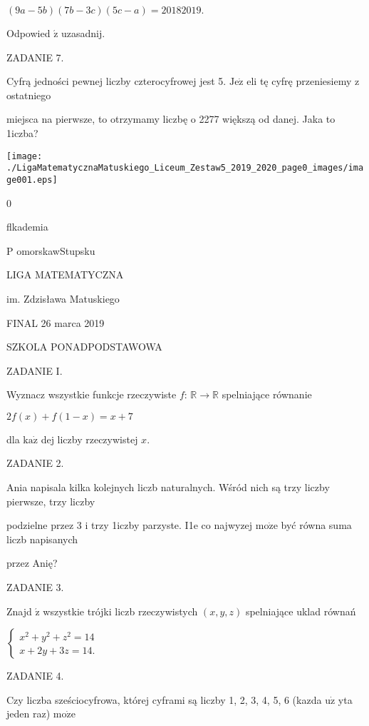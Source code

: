 \documentclass[a4paper,12pt]{article}
\begin{document}
$(9a-5b)(7b-3c)(5c-a)=20182019.$

Odpowied $\acute{\mathrm{z}}$ uzasadnij.

ZADANIE 7.

Cyfrą jedności pewnej liczby czterocyfrowej jest 5. $\mathrm{J}\mathrm{e}\dot{\mathrm{z}}$ eli tę cyfrę przeniesiemy z ostatniego

miejsca na pierwsze, to otrzymamy liczbę o 2277 większą od danej. Jaka to 1iczba?





\begin{center}
\texttt{[image: ./LigaMatematycznaMatuskiego\_Liceum\_Zestaw5\_2019\_2020\_page0\_images/image001.eps]}
\end{center}
0

flkademia

P omorskawStupsku

LIGA MATEMATYCZNA

im. Zdzisława Matuskiego

FINAL 26 marca 2019

SZKOLA PONADPODSTAWOWA

ZADANIE I.

Wyznacz wszystkie funkcje rzeczywiste $f$: $\mathbb{R}\rightarrow \mathbb{R}$ spelniające równanie

$2f(x)+f(1-x)=x+7$

dla $\mathrm{k}\mathrm{a}\dot{\mathrm{z}}$ dej liczby rzeczywistej $x.$

ZADANIE 2.

Ania napisala kilka kolejnych liczb naturalnych. Wśród nich są trzy liczby pierwsze, trzy liczby

podzielne przez 3 i trzy 1iczby parzyste. I1e co najwyzej $\mathrm{m}\mathrm{o}\dot{\mathrm{z}}\mathrm{e}$ być równa suma liczb napisanych

przez Anię?

ZADANIE 3.

Znajd $\acute{\mathrm{z}}$ wszystkie trójki liczb rzeczywistych $(x,y,z)$ spelniające uklad równań

$\left\{\begin{array}{l}
x^{2}+y^{2}+z^{2}=14\\
x+2y+3z=14.
\end{array}\right.$

ZADANIE 4.

Czy liczba sześciocyfrowa, której cyframi są liczby 1, 2, 3, 4, 5, 6 (kazda $\mathrm{u}\dot{\mathrm{z}}$ yta jeden raz) $\mathrm{m}\mathrm{o}\dot{\mathrm{z}}\mathrm{e}$
\end{document}
